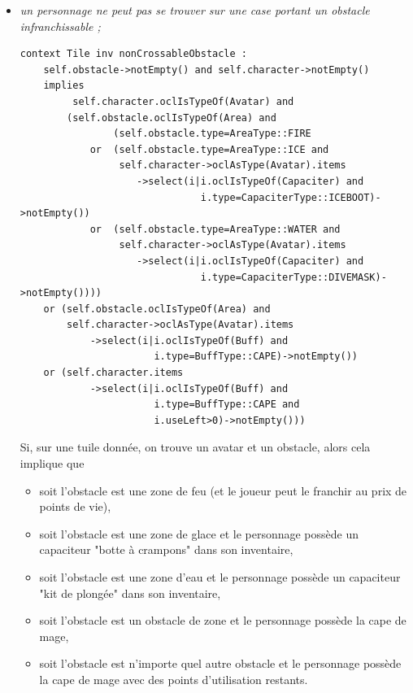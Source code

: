 \documentclass[oneside,a4paper]{book}
\begin{document}
\begin{itemize}
    \item \textit{un personnage ne peut pas se trouver sur une case portant un obstacle infranchissable ;}
    \begin{samepage}
        \begin{lstlisting}
context Tile inv nonCrossableObstacle : 
    self.obstacle->notEmpty() and self.character->notEmpty()
    implies 
         self.character.oclIsTypeOf(Avatar) and
        (self.obstacle.oclIsTypeOf(Area) and
                (self.obstacle.type=AreaType::FIRE 
            or  (self.obstacle.type=AreaType::ICE and
                 self.character->oclAsType(Avatar).items
                    ->select(i|i.oclIsTypeOf(Capaciter) and
                               i.type=CapaciterType::ICEBOOT)->notEmpty()) 
            or  (self.obstacle.type=AreaType::WATER and
                 self.character->oclAsType(Avatar).items
                    ->select(i|i.oclIsTypeOf(Capaciter) and
                               i.type=CapaciterType::DIVEMASK)->notEmpty())))
    or (self.obstacle.oclIsTypeOf(Area) and
        self.character->oclAsType(Avatar).items
            ->select(i|i.oclIsTypeOf(Buff) and
                       i.type=BuffType::CAPE)->notEmpty())
    or (self.character.items
            ->select(i|i.oclIsTypeOf(Buff) and
                       i.type=BuffType::CAPE and
                       i.useLeft>0)->notEmpty()))
        \end{lstlisting}
    \end{samepage}
    \begin{samepage}
    Si, sur une tuile donnée, on trouve un avatar et un obstacle, alors cela implique que
    \begin{itemize}
        \item soit l'obstacle est une zone de feu (et le joueur peut le franchir au prix de points de vie),
        \item soit l'obstacle est une zone de glace et le personnage possède un capaciteur "botte à crampons" dans son inventaire,
        \item soit l'obstacle est une zone d'eau et le personnage possède un capaciteur "kit de plongée" dans son inventaire,
        \item soit l'obstacle est un obstacle de zone et le personnage possède la cape de mage,
        \item soit l'obstacle est n'importe quel autre obstacle et le personnage possède la cape de mage avec des points d'utilisation restants.
    \end{itemize}
    \end{samepage}


\end{itemize}
\end{document}
